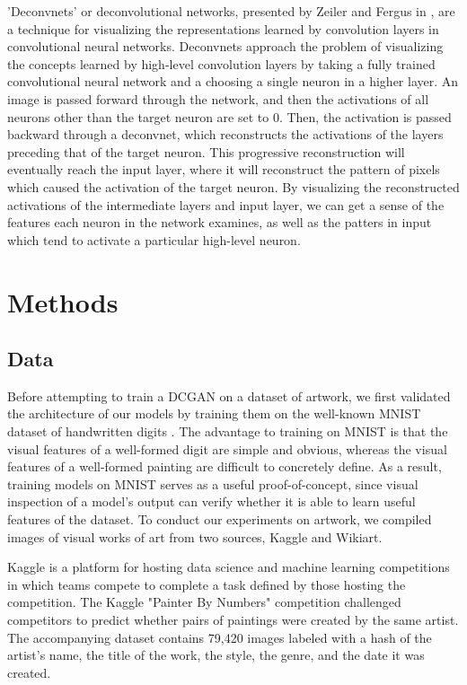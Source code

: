 \documentclass[10pt,twocolumn,letterpaper]{article}
\begin{document}
'Deconvnets' or deconvolutional networks, presented by Zeiler and Fergus in \cite{zeiler2014visualizing}, are a technique for visualizing the representations learned by convolution layers in convolutional neural networks. Deconvnets approach the problem of visualizing the concepts learned by high-level convolution layers by taking a fully trained convolutional neural network and a choosing a single neuron in a higher layer. An image is passed forward through the network, and then the activations of all neurons other than the target neuron are set to 0. Then, the activation is passed backward through a deconvnet, which reconstructs the activations of the layers preceding that of the target neuron. This progressive reconstruction will eventually reach the input layer, where it will reconstruct the pattern of pixels which caused the activation of the target neuron. By visualizing the reconstructed activations of the intermediate layers and input layer, we can get a sense of the features each neuron in the network examines, as well as the patters in input which tend to activate a particular high-level neuron.

\section{Methods}
\subsection{Data}
Before attempting to train a DCGAN on a dataset of artwork, we first validated the architecture of our models by training them on the well-known MNIST dataset of handwritten digits \cite{lecun2010mnist}. The advantage to training on MNIST is that the visual features of a well-formed digit are simple and obvious, whereas the visual features of a well-formed painting are difficult to concretely define. As a result, training models on MNIST serves as a useful proof-of-concept, since visual inspection of a model's output can verify whether it is able to learn useful features of the dataset. To conduct our experiments on artwork, we compiled images of visual works of art from two sources, Kaggle and Wikiart.

Kaggle is a platform for hosting data science and machine learning competitions in which teams compete to complete a task defined by those hosting the competition. The Kaggle "Painter By Numbers" competition challenged competitors to predict whether pairs of paintings were created by the same artist. The accompanying dataset contains 79,420 images labeled with a hash of the artist's name, the title of the work, the style, the genre, and the date it was created.
\end{document}
